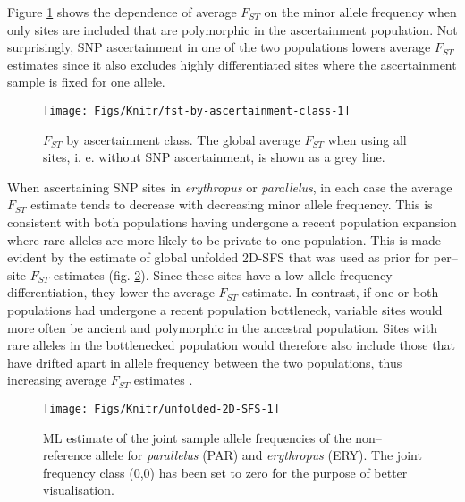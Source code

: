 \documentclass[a4paper,12pt,times,authoryear,twoside,print,index]{Classes/PhDThesisPSnPDF}\usepackage[]{graphicx}\usepackage[]{color}
\newenvironment{knitrout}{}{} %
\begin{document}
Figure \ref{Fig:fst-by-ascert-class} shows the dependence of average $F_{ST}$ on the minor allele frequency when only sites are included that are polymorphic in the ascertainment population. Not surprisingly, SNP ascertainment in one of the two populations lowers average $F_{ST}$ estimates since it also excludes highly differentiated sites where the ascertainment sample is fixed for one allele.
%
\begin{figure}[htb]
\centering
\begin{knitrout}
\color{fgcolor}

{\centering \texttt{[image: Figs/Knitr/fst-by-ascertainment-class-1]} 

}



\end{knitrout}
\caption{$F_{ST}$ by ascertainment class. The global average $F_{ST}$ when using all sites, i. e. without SNP ascertainment, is shown as a grey line.}
\label{Fig:fst-by-ascert-class}
\end{figure}
%
When ascertaining SNP sites in \textit{erythropus} or \textit{parallelus}, in each case the average $F_{ST}$ estimate tends to decrease with decreasing minor allele frequency. This is consistent with both populations having undergone a recent population expansion where rare alleles are more likely to be private to one population. This is made evident by the estimate of global unfolded 2D-\gls{SFS} that was used as prior for per--site $F_{ST}$ estimates (fig. \ref{Fig:unfolded-2D-SFS}). Since these sites have a low allele frequency differentiation, they lower the average $F_{ST}$ estimate. In contrast, if one or both populations had undergone a recent population bottleneck, variable sites would more often be ancient and polymorphic in the ancestral population. Sites with rare alleles in the bottlenecked population would therefore also include those that have drifted apart in allele frequency between the two populations, thus increasing average $F_{ST}$ estimates \citep{Bhatia2013}.
%
\begin{figure}[H]
\centering
\begin{knitrout}
\color{fgcolor}

{\centering \texttt{[image: Figs/Knitr/unfolded-2D-SFS-1]} 

}



\end{knitrout}
\caption{ML estimate of the joint sample allele frequencies of the non--reference allele for \textit{parallelus} (PAR) and \textit{erythropus} (ERY). The joint frequency class (0,0) has been set to zero for the purpose of better visualisation.}
\label{Fig:unfolded-2D-SFS}
\end{figure}
%
\end{document}
